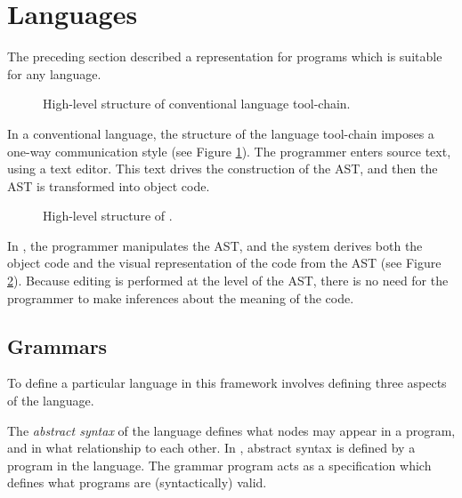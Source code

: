 \section{Languages}
The preceding section described a representation for programs which is suitable for any language. 

\begin{figure}
\caption{\label{fig-text} High-level structure of conventional language tool-chain.}
\end{figure}

In a conventional language, the structure of the language tool-chain imposes a one-way communication style (see Figure \ref{fig-text}). The programmer enters source text, using a text editor. This text drives the construction of the AST, and then the AST is transformed into object code. 






\begin{figure}
\caption{\label{fig-tree} High-level structure of \Meta.}
\end{figure}

In \Meta, the programmer manipulates the AST, and the system derives both the object code and the visual representation of the code from the AST (see Figure \ref{fig-tree}). Because editing is performed at the level of the AST, there is no need for the programmer to make inferences about the meaning of the code.


\subsection{Grammars}
To define a particular language in this framework involves defining three aspects of the language.

The \emph{abstract syntax} of the language defines what nodes may appear in a program, and in what relationship to each other. In \Meta, abstract syntax is defined by a program in the  language. The grammar program acts as a specification which defines what programs are (syntactically) valid. 

